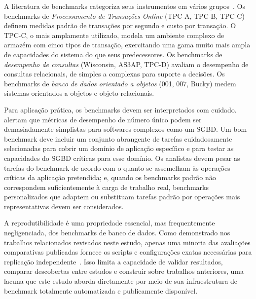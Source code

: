 A literatura de benchmarks categoriza seus instrumentos em vários grupos~\cite{Ramakrishnan2003}.
Os benchmarks de \textit{Processamento de Transações Online} (TPC-A, TPC-B, TPC-C) definem
medidas padrão de transações por segundo e custo por transação. O TPC-C, o mais amplamente
utilizado, modela um ambiente complexo de armazém com cinco tipos de transação, exercitando uma
gama muito mais ampla de capacidades do sistema do que seus predecessores. Os benchmarks de
\textit{desempenho de consultas} (Wisconsin, AS3AP, TPC-D) avaliam o desempenho de consultas
relacionais, de simples a complexas para suporte a decisões. Os benchmarks de \textit{banco de
dados orientado a objetos} (001, 007, Bucky) medem sistemas orientados a objetos e
objeto-relacionais.

Para aplicação prática, os benchmarks devem ser interpretados com cuidado.
\cite{Ramakrishnan2003} alertam que métricas de desempenho de número único podem ser
demasiadamente simplistas para softwares complexos como um SGBD. Um bom benchmark deve incluir
um conjunto abrangente de tarefas cuidadosamente selecionadas para cobrir um domínio de
aplicação específico e para testar as capacidades do SGBD críticas para esse domínio. Os
analistas devem pesar as tarefas do benchmark de acordo com o quanto se assemelham às operações
críticas da aplicação pretendida; e, quando os benchmarks padrão não correspondem
suficientemente à carga de trabalho real, benchmarks personalizados que adaptem ou substituam
tarefas padrão por operações mais representativas devem ser considerados.

A reprodutibilidade é uma propriedade essencial, mas frequentemente negligenciada, dos benchmarks
de banco de dados. Como demonstrado nos trabalhos relacionados revisados neste estudo, apenas
uma minoria das avaliações comparativas publicadas fornece os scripts e configurações exatas
necessárias para replicação independente~\cite{pereira2023mulletbench}. Isso limita a capacidade
de validar resultados, comparar descobertas entre estudos e construir sobre trabalhos anteriores,
uma lacuna que este estudo aborda diretamente por meio de sua infraestrutura de benchmark
totalmente automatizada e publicamente disponível.
